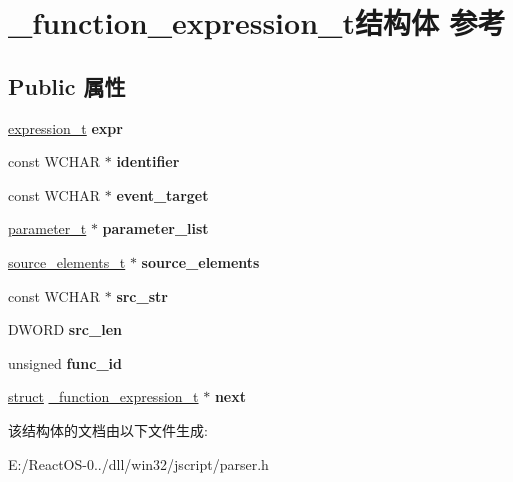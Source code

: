\hypertarget{struct__function__expression__t}{}\section{\+\_\+function\+\_\+expression\+\_\+t结构体 参考}
\label{struct__function__expression__t}
\subsection*{Public 属性}
\begin{DoxyCompactItemize}
\item 
\mbox{\label{struct__function__expression__t_a63e5000db072d80c1b55335900fd8d1a}} 
\hyperlink{struct__expression__t}{expression\+\_\+t} {\bfseries expr}
\item 
\mbox{\label{struct__function__expression__t_af83be4ec6f51c096d78237acb461ea7b}} 
const W\+C\+H\+AR $\ast$ {\bfseries identifier}
\item 
\mbox{\label{struct__function__expression__t_a079cec4c484ea504c8955f79430ee0d8}} 
const W\+C\+H\+AR $\ast$ {\bfseries event\+\_\+target}
\item 
\mbox{\label{struct__function__expression__t_a4c0c78a4158a9cca3dacfbe10539bb88}} 
\hyperlink{struct__parameter__t}{parameter\+\_\+t} $\ast$ {\bfseries parameter\+\_\+list}
\item 
\mbox{\label{struct__function__expression__t_adb9571496605eae58de3bd249f77aa9c}} 
\hyperlink{struct__source__elements__t}{source\+\_\+elements\+\_\+t} $\ast$ {\bfseries source\+\_\+elements}
\item 
\mbox{\label{struct__function__expression__t_a80ca24e8ed467ad89a6d02f2cb6dfa73}} 
const W\+C\+H\+AR $\ast$ {\bfseries src\+\_\+str}
\item 
\mbox{\label{struct__function__expression__t_a8714cfb16b2d49e24c9bed6fba78a8c4}} 
D\+W\+O\+RD {\bfseries src\+\_\+len}
\item 
\mbox{\label{struct__function__expression__t_ac6841ae66a82027476609c5fc07f3962}} 
unsigned {\bfseries func\+\_\+id}
\item 
\mbox{\label{struct__function__expression__t_a98e38f26ff7499c106ca2f5ad6758b0d}} 
\hyperlink{interfacestruct}{struct} \hyperlink{struct__function__expression__t}{\+\_\+function\+\_\+expression\+\_\+t} $\ast$ {\bfseries next}
\end{DoxyCompactItemize}


该结构体的文档由以下文件生成\+:\begin{DoxyCompactItemize}
\item 
E\+:/\+React\+O\+S-\/0../dll/win32/jscript/parser.\+h\end{DoxyCompactItemize}
